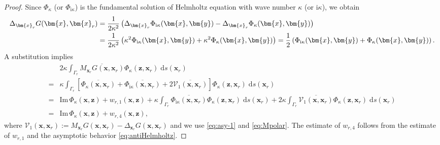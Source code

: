 \documentclass[10pt,a4paper]{article}
\numberwithin{equation}{section}
\begin{document}
\begin{proof}
   Since $\Phi_{\kappa}$ (or $\Phi_{\mathrm{ i } \kappa}$) is the fundamental solution of Helmholtz equation with wave number $\kappa$ (or $\mathrm{ i } \kappa$), we obtain
   \begin{align}
     \notag
     \Delta_{\bm{ x }_r}  G(\bm{ x },\bm{ x }_r)
     &= \frac{1}{2\kappa^{2}}\left(\Delta_{\bm{ x }_r}\Phi_{\mathrm{i}\kappa}(\bm{x},\bm{y})
       -\Delta_{\bm{ x }_r} \Phi_{\kappa}(\bm{x},\bm{y})\right)\\
     \label{eq:laplace}
     & =  \frac{1}{2\kappa^{2}}\left(\kappa^2\Phi_{\mathrm{i}\kappa}(\bm{x},\bm{y})
           +\kappa^2\Phi_{\kappa}(\bm{x},\bm{y})\right)
      = \frac{1}{2}\left(\Phi_{\mathrm{i}\kappa}(\bm{x},\bm{y})
           +\Phi_{\kappa}(\bm{x},\bm{y})\right).
   \end{align}
   A substitution implies
   \begin{align*}
     & 2 \kappa\int_{ \Gamma_{r} }\overline{M_{\bm{ x }_r} G(\bm{ x },\bm{ x }_r)}\Phi_{\kappa}(\bm{ z },\bm{ x }_r) \;\mathrm{d}s(\bm{ x }_r)\\
     =&  \kappa \int_{ \Gamma_{r} }\left[\overline{ \Phi_{\kappa}(\bm{ x },\bm{ x }_r)}
          + 
        \overline{ \Phi_{\mathrm{ i } \kappa}(\bm{ x },\bm{ x }_r)}
   + 2 \overline{\mathcal{V}_1(\bm{ x },\bm{ x }_r) }\right] \Phi_{\kappa}(\bm{ z },\bm{ x }_r) \;\mathrm{d}s(\bm{ x }_r)  \\
     =&   \mathrm{Im}\, \Phi_{\kappa} (\bm{ x }, \bm{ z }) + w_{r,1} (\bm{ x }, \bm{ z })
        + \kappa \int_{ \Gamma_{r} }\overline{ \Phi_{\mathrm{ i }\kappa}(\bm{ x },\bm{ x }_r)}\Phi_{\kappa}(\bm{ z },\bm{ x }_r) \;\mathrm{d}s(\bm{ x }_r) 
        + 2 \kappa\int_{ \Gamma_{r} }\overline{\mathcal{V}_1(\bm{ x },\bm{ x }_r) }\Phi_{\kappa}(\bm{ z },\bm{ x }_r) \;\mathrm{d}s(\bm{ x }_r)  \\
       =&   \mathrm{Im}\, \Phi_{\kappa} (\bm{ x }, \bm{ z }) + w_{r,4} (\bm{ x }, \bm{ z }),
   \end{align*}
   where $\mathcal{V}_1(\bm{ x },\bm{ x }_r):=M_{\bm{ x }_r} G(\bm{ x },\bm{ x }_r)
        -\Delta_{\bm{ x }_r}G(\bm{ x },\bm{ x }_r)$  and we use \eqref{eq:asy-1} 
   and \eqref{eq:Mpolar}.  The estimate of $w_{r,4}$ follows from the estimate of $w_{r,1}$ and the asymptotic behavior \eqref{eq:antiHelmholtz}.


\end{proof}
\end{document}
